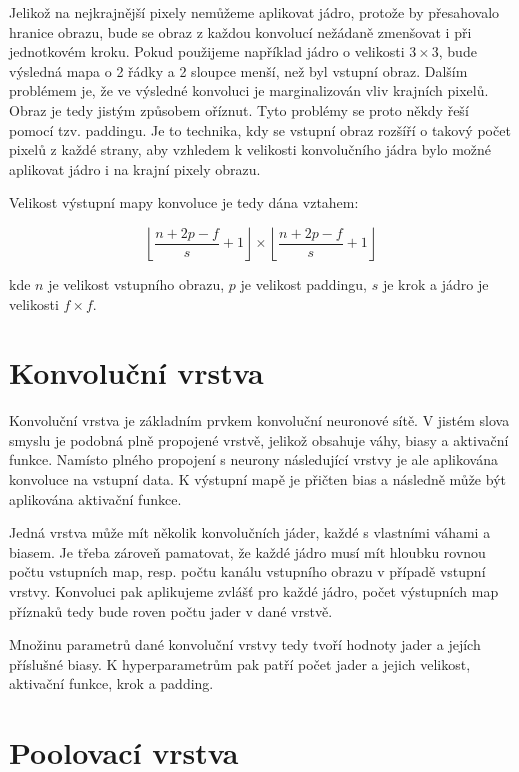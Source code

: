 Jelikož na nejkrajnější pixely nemůžeme aplikovat jádro, protože by přesahovalo
hranice obrazu, bude se obraz z každou konvolucí nežádaně zmenšovat i při
jednotkovém kroku. Pokud použijeme například jádro o velikosti $3 \times 3$,
bude výsledná mapa o 2 řádky a 2 sloupce menší, než byl vstupní obraz. Dalším
problémem je, že ve výsledné konvoluci je marginalizován vliv krajních pixelů.
Obraz je tedy jistým způsobem oříznut. Tyto problémy se proto někdy řeší pomocí
tzv. paddingu. Je to technika, kdy se vstupní obraz rozšíří o takový počet
pixelů z každé strany, aby vzhledem k velikosti konvolučního jádra bylo možné
aplikovat jádro i na krajní pixely obrazu.

Velikost výstupní mapy konvoluce je tedy dána vztahem:

\begin{equation*}
    \left\lfloor \frac{n+2p-f}{s}+1 \right\rfloor \times \left\lfloor \frac{n+2p-f}{s}+1 \right\rfloor
\end{equation*}

kde $n$ je velikost vstupního obrazu, $p$ je velikost paddingu, $s$ je krok a
jádro je velikosti $f \times f$.

\section{Konvoluční vrstva}

Konvoluční vrstva je základním prvkem konvoluční neuronové sítě. V jistém slova
smyslu je podobná plně propojené vrstvě, jelikož obsahuje váhy, biasy a
aktivační funkce. Namísto plného propojení s neurony následující vrstvy je ale
aplikována konvoluce na vstupní data. K výstupní mapě je přičten bias a
následně může být aplikována aktivační funkce.

Jedná vrstva může mít několik konvolučních jáder, každé s vlastními váhami a
biasem. Je třeba zároveň pamatovat, že každé jádro musí mít hloubku rovnou
počtu vstupních map, resp. počtu kanálu vstupního obrazu v případě vstupní
vrstvy. Konvoluci pak aplikujeme zvlášť pro každé jádro, počet výstupních map
příznaků tedy bude roven počtu jader v dané vrstvě.

Množinu parametrů dané konvoluční vrstvy tedy tvoří hodnoty jader a jejích
příslušné biasy. K hyperparametrům pak patří počet jader a jejich velikost,
aktivační funkce, krok a padding.

\section{Poolovací vrstva}

\endinput
